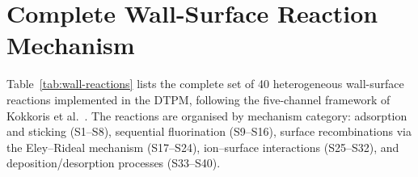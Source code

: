 \documentclass[11pt,a4paper]{report}
\begin{document}
\section{Complete Wall-Surface Reaction Mechanism}
\label{sec:wall-reactions-full}

Table~\ref{tab:wall-reactions} lists the complete set of 40 heterogeneous wall-surface reactions implemented in the DTPM, following the five-channel framework of Kokkoris et al.~\cite{Kokkoris2009}.  The reactions are organised by mechanism category: adsorption and sticking (S1--S8), sequential fluorination (S9--S16), surface recombinations via the Eley--Rideal mechanism (S17--S24), ion--surface interactions (S25--S32), and deposition/desorption processes (S33--S40).
\end{document}
